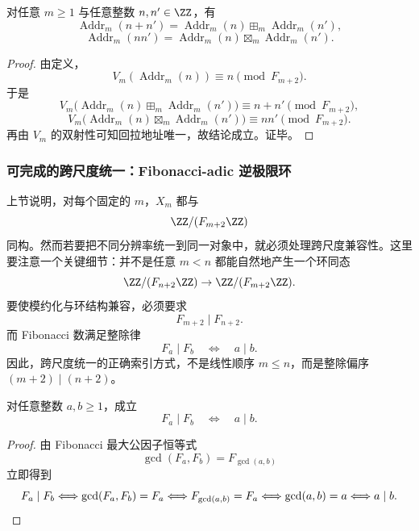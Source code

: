 \begin{proposition}[数值化的自然性]
对任意 \(m\ge 1\) 与任意整数 \(n,n'\in \ZZ\)，有
\[
\operatorname{Addr}_m(n+n')
=
\operatorname{Addr}_m(n)\boxplus_m \operatorname{Addr}_m(n'),
\]
\[
\operatorname{Addr}_m(nn')
=
\operatorname{Addr}_m(n)\boxtimes_m \operatorname{Addr}_m(n').
\]
\end{proposition}
\begin{proof}
由定义，
\[
V_m(\operatorname{Addr}_m(n))
\equiv n \pmod{F_{m+2}}.
\]
于是
\[
V_m\bigl(\operatorname{Addr}_m(n)\boxplus_m \operatorname{Addr}_m(n')\bigr)
\equiv n+n' \pmod{F_{m+2}},
\]
\[
V_m\bigl(\operatorname{Addr}_m(n)\boxtimes_m \operatorname{Addr}_m(n')\bigr)
\equiv nn' \pmod{F_{m+2}}.
\]
再由 \(V_m\) 的双射性可知回拉地址唯一，故结论成立。证毕。
\end{proof}

\subsubsection{可完成的跨尺度统一：Fibonacci-adic 逆极限环}\label{subsubsec:fib-adic-inverse-limit}

上节说明，对每个固定的 \(m\)，\(X_m\) 都与
\[
\ZZ/(F_{m+2}\ZZ)
\]
同构。然而若要把不同分辨率统一到同一对象中，就必须处理跨尺度兼容性。这里要注意一个关键细节：并不是任意 \(m<n\) 都能自然地产生一个环同态
\[
\ZZ/(F_{n+2}\ZZ)\to \ZZ/(F_{m+2}\ZZ).
\]
要使模约化与环结构兼容，必须要求
\[
F_{m+2}\mid F_{n+2}.
\]
而 Fibonacci 数满足整除律
\[
F_a\mid F_b \quad\Longleftrightarrow\quad a\mid b.
\]
因此，跨尺度统一的正确索引方式，不是线性顺序 \(m\le n\)，而是整除偏序 \((m+2)\mid (n+2)\)。

\begin{lemma}\label{lem:fib-divisibility-iff}
对任意整数 \(a,b\ge 1\)，成立
\[
F_a\mid F_b\quad\Longleftrightarrow\quad a\mid b.
\]
\end{lemma}
\begin{proof}
由 Fibonacci 最大公因子恒等式
\[
\gcd(F_a,F_b)=F_{\gcd(a,b)}
\]
立即得到
\[
F_a\mid F_b
\Longleftrightarrow
\gcd(F_a,F_b)=F_a
\Longleftrightarrow
F_{\gcd(a,b)}=F_a
\Longleftrightarrow
\gcd(a,b)=a
\Longleftrightarrow
a\mid b.
\qedhere
\]
\end{proof}

